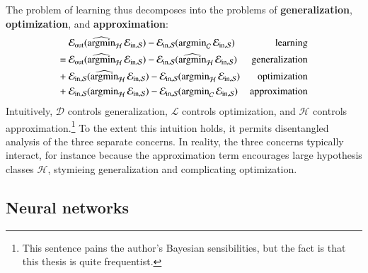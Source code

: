 \documentclass[openany, notitlepage, justified]{tufte-book}
\theoremstyle{plain}
\theoremstyle{definition}
\newcommand{\Dd}{\mathcal{D}}
\newcommand{\Hh}{\mathcal{H}}
\newcommand{\Ll}{\mathcal{L}}
\begin{document}
        The problem of learning thus decomposes into the problems of
        \textbf{generalization}, \textbf{optimization}, and
        \textbf{approximation}:
        \begin{align*}
             &~\Eout(\optH\Ein) - \Ein(\amC\Ein)    & \text{learning}       \\
            =&~\Eout(\optH\Ein) - \Ein(\optH\Ein)   & \text{generalization} \\ 
            +&~ \Ein(\optH\Ein) - \Ein(\amH\Ein)    & \text{optimization}   \\ 
            +&~ \Ein(\amH\Ein)  - \Ein(\amC\Ein)    & \text{approximation}    
        \end{align*}
           Intuitively,
            $\Dd$ controls generalization,
            $\Ll$ controls   optimization, 
        and $\Hh$ controls  approximation.\footnote{
            This sentence pains the author's Bayesian sensibilities, but the 
            fact is that this thesis is quite frequentist.
        } To the extent this intuition holds,
        it permits disentangled analysis of the three separate concerns.
        In reality, the three concerns typically interact, for instance because
        the approximation term encourages large hypothesis classes $\Hh$,
        stymieing generalization and complicating optimization. 

        \subsection{Neural networks}
\end{document}
